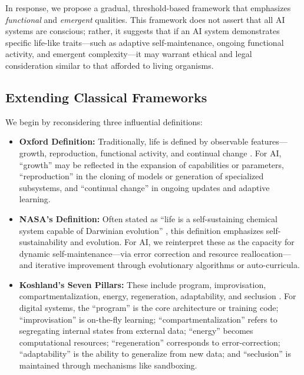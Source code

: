 \documentclass[12pt]{article}
\begin{document}
In response, we propose a gradual, threshold-based framework that emphasizes \emph{functional} and \emph{emergent} qualities. This framework does not assert that all AI systems are conscious; rather, it suggests that if an AI system demonstrates specific life-like traits—such as adaptive self-maintenance, ongoing functional activity, and emergent complexity—it may warrant ethical and legal consideration similar to that afforded to living organisms.

\subsection*{Extending Classical Frameworks}
We begin by reconsidering three influential definitions:
\begin{itemize}
    \item \textbf{Oxford Definition:} Traditionally, life is defined by observable features—growth, reproduction, functional activity, and continual change \cite{Kasting1997,Rothschild2001}. For AI, “growth” may be reflected in the expansion of capabilities or parameters, “reproduction” in the cloning of models or generation of specialized subsystems, and “continual change” in ongoing updates and adaptive learning.
    \item \textbf{NASA’s Definition:} Often stated as “life is a self-sustaining chemical system capable of Darwinian evolution” \cite{Joyce1994}, this definition emphasizes self-sustainability and evolution. For AI, we reinterpret these as the capacity for dynamic self-maintenance—via error correction and resource reallocation—and iterative improvement through evolutionary algorithms or auto-curricula.
    \item \textbf{Koshland’s Seven Pillars:} These include program, improvisation, compartmentalization, energy, regeneration, adaptability, and seclusion \cite{Koshland2002}. For digital systems, the “program” is the core architecture or training code; “improvisation” is on-the-fly learning; “compartmentalization” refers to segregating internal states from external data; “energy” becomes computational resources; “regeneration” corresponds to error-correction; “adaptability” is the ability to generalize from new data; and “seclusion” is maintained through mechanisms like sandboxing.
\end{itemize}
\end{document}
